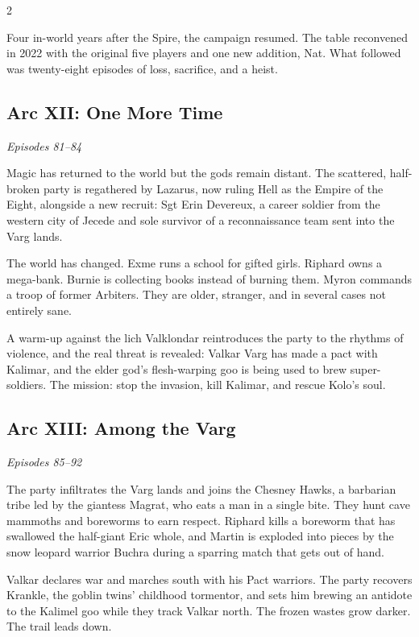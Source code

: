 \begin{multicols}{2}

\noindent
Four in-world years after the Spire, the campaign resumed.  The table reconvened in 2022 with the original five players and one new addition, Nat.  What followed was twenty-eight episodes of loss, sacrifice, and a heist.

\subsection*{Arc XII: One More Time}
\textit{Episodes 81--84}

\medskip

\noindent
Magic has returned to the world but the gods remain distant.  The scattered, half-broken party is regathered by Lazarus, now ruling Hell as the Empire of the Eight, alongside a new recruit: Sgt Erin Devereux, a career soldier from the western city of Jecede and sole survivor of a reconnaissance team sent into the Varg lands.

The world has changed.  Exme runs a school for gifted girls.  Riphard owns a mega-bank.  Burnie is collecting books instead of burning them.  Myron commands a troop of former Arbiters.  They are older, stranger, and in several cases not entirely sane.

A warm-up against the lich Valklondar reintroduces the party to the rhythms of violence, and the real threat is revealed: Valkar Varg has made a pact with Kalimar, and the elder god's flesh-warping goo is being used to brew super-soldiers.  The mission: stop the invasion, kill Kalimar, and rescue Kolo's soul.

\subsection*{Arc XIII: Among the Varg}
\textit{Episodes 85--92}

\medskip

\noindent
The party infiltrates the Varg lands and joins the Chesney Hawks, a barbarian tribe led by the giantess Magrat, who eats a man in a single bite.  They hunt cave mammoths and boreworms to earn respect.  Riphard kills a boreworm that has swallowed the half-giant Eric whole, and Martin is exploded into pieces by the snow leopard warrior Buchra during a sparring match that gets out of hand.

Valkar declares war and marches south with his Pact warriors.  The party recovers Krankle, the goblin twins' childhood tormentor, and sets him brewing an antidote to the Kalimel goo while they track Valkar north.  The frozen wastes grow darker.  The trail leads down.


\end{multicols}
